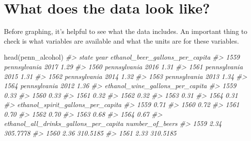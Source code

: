 \documentclass[
]{krantz}
\makeatletter
\newenvironment{Shaded}{\begin{snugshade}}{\end{snugshade}}
\newcommand{\CommentTok}[1]{\textcolor[rgb]{0.37,0.37,0.37}{\textit{#1}}}
\newcommand{\FunctionTok}[1]{\textcolor[rgb]{0,0,0}{#1}}
\newcommand{\NormalTok}[1]{#1}
\newenvironment{kframe}{%
\medskip{}
\setlength{\fboxsep}{.8em}
 \def\at@end@of@kframe{}%
 \ifinner\ifhmode%
  \def\at@end@of@kframe{\end{minipage}}%
  \begin{minipage}{\columnwidth}%
 \fi\fi%
 \def\FrameCommand##1{\hskip\@totalleftmargin \hskip-\fboxsep
 \colorbox{shadecolor}{##1}\hskip-\fboxsep
     \hskip-\linewidth \hskip-\@totalleftmargin \hskip\columnwidth}%
 \MakeFramed {\advance\hsize-\width
   \@totalleftmargin\z@ \linewidth\hsize
   \@setminipage}}%
 {\par\unskip\endMakeFramed%
 \at@end@of@kframe}
\renewenvironment{Shaded}{\begin{kframe}}{\end{kframe}}
\makeatother
\begin{document}
\hypertarget{what-does-the-data-look-like}{%
\section{What does the data look
like?}\label{what-does-the-data-look-like}}

Before graphing, it's helpful to see what the data includes.
An important thing to check is what variables are available
and what the units are for these variables.

\begin{Shaded}
\begin{Highlighting}[]
\FunctionTok{head}\NormalTok{(penn\_alcohol)}
\CommentTok{\#\textgreater{}             state year ethanol\_beer\_gallons\_per\_capita}
\CommentTok{\#\textgreater{} 1559 pennsylvania 2017                            1.29}
\CommentTok{\#\textgreater{} 1560 pennsylvania 2016                            1.31}
\CommentTok{\#\textgreater{} 1561 pennsylvania 2015                            1.31}
\CommentTok{\#\textgreater{} 1562 pennsylvania 2014                            1.32}
\CommentTok{\#\textgreater{} 1563 pennsylvania 2013                            1.34}
\CommentTok{\#\textgreater{} 1564 pennsylvania 2012                            1.36}
\CommentTok{\#\textgreater{}      ethanol\_wine\_gallons\_per\_capita}
\CommentTok{\#\textgreater{} 1559                            0.33}
\CommentTok{\#\textgreater{} 1560                            0.33}
\CommentTok{\#\textgreater{} 1561                            0.32}
\CommentTok{\#\textgreater{} 1562                            0.32}
\CommentTok{\#\textgreater{} 1563                            0.31}
\CommentTok{\#\textgreater{} 1564                            0.31}
\CommentTok{\#\textgreater{}      ethanol\_spirit\_gallons\_per\_capita}
\CommentTok{\#\textgreater{} 1559                              0.71}
\CommentTok{\#\textgreater{} 1560                              0.72}
\CommentTok{\#\textgreater{} 1561                              0.70}
\CommentTok{\#\textgreater{} 1562                              0.70}
\CommentTok{\#\textgreater{} 1563                              0.68}
\CommentTok{\#\textgreater{} 1564                              0.67}
\CommentTok{\#\textgreater{}      ethanol\_all\_drinks\_gallons\_per\_capita number\_of\_beers}
\CommentTok{\#\textgreater{} 1559                                  2.34        305.7778}
\CommentTok{\#\textgreater{} 1560                                  2.36        310.5185}
\CommentTok{\#\textgreater{} 1561                                  2.33        310.5185}

\end{Highlighting}
\end{Shaded}
\end{document}
